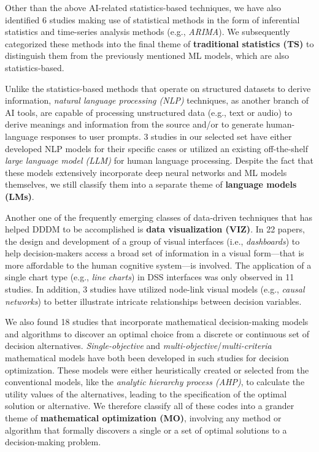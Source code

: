 \documentclass{sfuthesis}
\begin{document}
Other than the above AI-related statistics-based techniques, we have also identified 6 studies making use of statistical methods in the form of inferential statistics and time-series analysis methods (e.g., \textit{ARIMA}). We subsequently categorized these methods into the final theme of \textbf{traditional statistics (TS)} to distinguish them from the previously mentioned ML models, which are also statistics-based.\par
Unlike the statistics-based methods that operate on structured datasets to derive information, \textit{natural language processing (NLP)} techniques, as another branch of AI tools, are capable of processing unstructured data (e.g., text or audio) to derive meanings and information from the source and/or to generate human-language responses to user prompts. 3 studies in our selected set have either developed NLP models for their specific cases or utilized an existing off-the-shelf \textit{large language model (LLM)} for human language processing. Despite the fact that these models extensively incorporate deep neural networks and ML models themselves, we still classify them into a separate theme of \textbf{language models (LMs)}.\par 
Another one of the frequently emerging classes of data-driven techniques that has helped DDDM to be accomplished is \textbf{data visualization (VIZ)}. In 22 papers, the design and development of a group of visual interfaces (i.e., \textit{dashboards}) to help decision-makers access a broad set of information in a visual form—that is more affordable to the human cognitive system—is involved. The application of a single chart type (e.g., \textit{line charts}) in DSS interfaces was only observed in 11 studies. In addition, 3 studies have utilized node-link visual models (e.g., \textit{causal networks}) to better illustrate intricate relationships between decision variables.\par
We also found 18 studies that incorporate mathematical decision-making models and algorithms to discover an optimal choice from a discrete or continuous set of decision alternatives. \textit{Single-objective} and \textit{multi-objective}/\textit{multi-criteria} mathematical models have both been developed in such studies for decision optimization. These models were either heuristically created or selected from the conventional models, like the \textit{analytic hierarchy process (AHP)}, to calculate the utility values of the alternatives, leading to the specification of the optimal solution or alternative. We therefore classify all of these codes into a grander theme of \textbf{mathematical optimization (MO)}, involving any method or algorithm that formally discovers a single or a set of optimal solutions to a decision-making problem.\par
\end{document}
